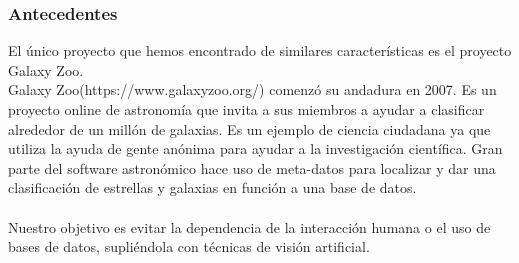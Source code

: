 	\subsubsection{Antecedentes }
	
	El único proyecto que hemos encontrado de similares características	es el proyecto Galaxy Zoo. \\
	Galaxy Zoo(https://www.galaxyzoo.org/) comenzó su andadura en 2007. Es un proyecto online de astronomía que invita a sus miembros a ayudar a clasificar alrededor de un millón de galaxias. Es un ejemplo de ciencia ciudadana ya que utiliza la ayuda de gente anónima para ayudar a la investigación científica. 
	Gran parte del software astronómico hace uso de meta-datos para localizar y dar una clasificación de estrellas y galaxias en función a una base de datos. \\
	\\Nuestro objetivo es evitar la dependencia de la interacción humana o el uso de bases de datos, supliéndola con técnicas de visión artificial.\\

